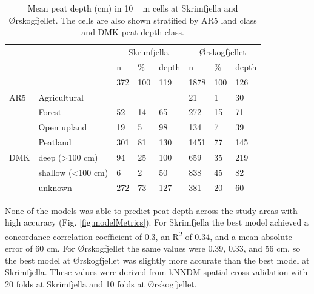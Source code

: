 \documentclass[soil, manuscript]{copernicus}
\begin{document}
\begin{table}[tbp]
\caption{Mean peat depth (cm) in \unit{10\,m} cells at Skrimfjella and Ørskogfjellet. The cells are also shown stratified by AR5 land class and DMK peat depth class.}
\begin{tabular}{llllllll}
\hline
    &                            & \multicolumn{3}{c}{Skrimfjella} & \multicolumn{3}{c}{Ørskogfjellet} \\ \cline{3-8} 
    &                            & n        & \%      & depth      & n          & \%      & depth      \\ \hline
    &                            & 372      & 100     & 119        & 1878       & 100     & 126        \\
AR5 & Agricultural               &          &         &            & 21         & 1       & 30         \\
    & Forest                     & 52       & 14      & 65         & 272        & 15      & 71         \\
    & Open upland                & 19       & 5       & 98         & 134        & 7       & 39         \\
    & Peatland                   & 301      & 81      & 130        & 1451       & 77      & 145        \\
DMK & deep (\textgreater 100 cm) & 94       & 25      & 100        & 659        & 35      & 219        \\
    & shallow (\textless 100 cm) & 6        & 2       & 50         & 838        & 45      & 82         \\
    & unknown                    & 272      & 73      & 127        & 381        & 20      & 60         \\ \hline
\end{tabular}
\label{tab:depthsByClass}
\end{table}

None of the models was able to predict peat depth across the study areas with high accuracy (Fig. \ref{fig:modelMetrics}).
For Skrimfjella the best model achieved a concordance correlation coefficient of 0.3, an R\textsuperscript{2} of 0.34, and a mean absolute error of 60 cm.
For Ørskogfjellet the same values were 0.39, 0.33, and 56 cm, so the best model at Ørskogfjellet was slightly more accurate than the best model at Skrimfjella.
These values were derived from kNNDM spatial cross-validation with 20 folds at Skrimfjella and 10 folds at Ørskogfjellet.
\end{document}
